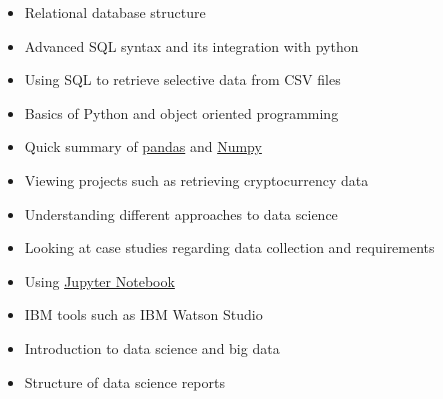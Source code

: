 \documentclass[11pt,a4paper,ragged2e]{altacv}
\begin{document}
\begin{paracol}{2}
\begin{itemize}
\item Relational database structure
\item Advanced SQL syntax and its integration with python
\item Using SQL to retrieve selective data from CSV files
\end{itemize}
\divider

\begin{itemize}
\item Basics of Python and object oriented programming
\item Quick summary of \href{https://pandas.pydata.org/}{pandas} and \href{https://numpy.org/}{Numpy}
\item Viewing projects such as retrieving cryptocurrency data
\end{itemize}
\divider

\begin{itemize}
\item Understanding different approaches to data science
\item Looking at case studies regarding data collection and requirements
\end{itemize}
\divider

\begin{itemize}
\item Using \href{https://jupyter.org/}{Jupyter Notebook}
\item IBM tools such as IBM Watson Studio
\end{itemize}
\divider

\begin{itemize}
\item Introduction to data science and big data
\item Structure of data science reports
\end{itemize}
\divider


\end{paracol}
\end{document}
